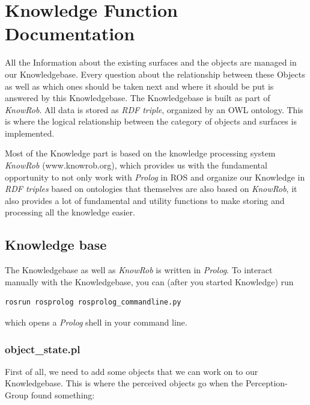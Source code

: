 \documentclass[main.tex]{subfiles}
\begin{document}
	\begingroup

	\renewcommand{\cleardoublepage}{}

	\renewcommand{\clearpage}{}

	\chapter{Knowledge Function Documentation}


All the Information about the existing surfaces and the objects are managed in our Knowledgebase. Every question about the relationship between these Objects as well as which ones should be taken next and where it should be put is answered by this Knowledgebase.  The Knowledgebase is built as part of \textit{KnowRob}. All data is stored as \textit{RDF triple}, organized by an OWL ontology. This is where the logical relationship between the category of objects and surfaces is implemented.

Most of the Knowledge part is based on the knowledge processing system \textit{KnowRob} (www.knowrob.org), which provides us with the fundamental opportunity to not only work with \textit{Prolog} in ROS and organize our Knowledge in \textit{RDF triples} based on ontologies that themselves are also based on \textit{KnowRob}, it also provides a lot of fundamental and utility functions to make storing and processing all the knowledge easier. 
		
\section{Knowledge base}

The Knowledgebase as well as \textit{KnowRob} is written in \textit{Prolog}. To interact manually with the Knowledgebase, you can (after you started Knowledge) run
\begin{lstlisting}
rosrun rosprolog rosprolog_commandline.py
\end{lstlisting}
which opens a \textit{Prolog} shell in your command line.

\subsection{object\_state.pl}

First of all, we need to add some objects that we can work on to our Knowledgebase. This is where the perceived objects go when the Perception-Group found something:
\end{document}
